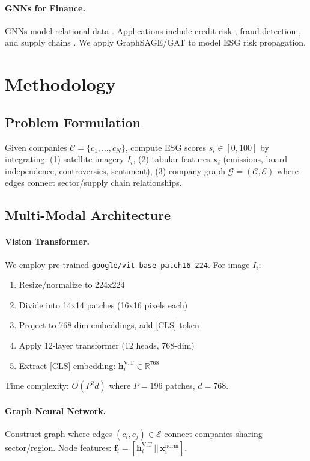 \documentclass[10pt,twocolumn]{article}
\begin{document}
\paragraph{GNNs for Finance.} GNNs model relational data \cite{hamilton2017inductive,veličković2017graph}. Applications include credit risk \cite{yang2020credit}, fraud detection \cite{liu2020fraud}, and supply chains \cite{anderson2024supply}. We apply GraphSAGE/GAT to model ESG risk propagation.

\section{Methodology}

\subsection{Problem Formulation}

Given companies $\mathcal{C} = \{c_1, \ldots, c_N\}$, compute ESG scores $s_i \in [0, 100]$ by integrating: (1) satellite imagery $I_i$, (2) tabular features $\mathbf{x}_i$ (emissions, board independence, controversies, sentiment), (3) company graph $\mathcal{G} = (\mathcal{C}, \mathcal{E})$ where edges connect sector/supply chain relationships.

\subsection{Multi-Modal Architecture}

\paragraph{Vision Transformer.} We employ pre-trained \texttt{google/vit-base-patch16-224}. For image $I_i$:
\begin{enumerate}
\item Resize/normalize to 224x224
\item Divide into 14x14 patches (16x16 pixels each)
\item Project to 768-dim embeddings, add [CLS] token
\item Apply 12-layer transformer (12 heads, 768-dim)
\item Extract [CLS] embedding: $\mathbf{h}_i^{\text{ViT}} \in \mathbb{R}^{768}$
\end{enumerate}
Time complexity: $O(P^2 d)$ where $P=196$ patches, $d=768$.

\paragraph{Graph Neural Network.} Construct graph where edges $(c_i, c_j) \in \mathcal{E}$ connect companies sharing sector/region. Node features: $\mathbf{f}_i = [\mathbf{h}_i^{\text{ViT}} \,||\, \mathbf{x}_i^{\text{norm}}]$.
\end{document}
